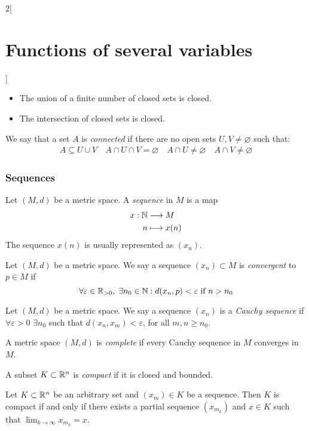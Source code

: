 \documentclass[../../../main.tex]{subfiles}
\begin{document}
\begin{multicols}{2}[\section{Functions of several variables}]
\begin{prop}
\begin{itemize}
            \item The union of a finite number of closed sets is closed.
            \item The intersection of closed sets is closed.
        \end{itemize}
    \end{prop}
    \begin{definition}
        We say that a set $A$ is \textit{connected} if there are no open sets $U,V\ne\varnothing$ such that:
        \begin{gather*}
            A\subseteq U\cup V\quad A\cap U\cap V=\varnothing\quad A\cap U\ne\varnothing\quad A\cap V\ne\varnothing
        \end{gather*}
    \end{definition}
    \subsubsection*{Sequences}
    \begin{definition}
        Let $(M,d)$ be a metric space. A \textit{sequence} in $M$ is a map
        \begin{align*}
            x:\mathbb{N} & \longrightarrow M \\
            n     & \longmapsto x(n)
        \end{align*}
        The sequence $x(n)$ is usually represented as $(x_n)$.
    \end{definition}
    \begin{definition}
        Let $(M,d)$ be a metric space. We say a sequence $(x_n)\subset M$ is \textit{convergent} to $p\in M$ if $$\forall\varepsilon\in\mathbb{R}_{>0},\;\exists n_0\in\mathbb{N} :d(x_n,p)<\varepsilon\text{ if }n>n_0$$
    \end{definition}
    \begin{definition}
        Let $(M,d)$ be a metric space. We say a sequence $(x_n)$ is a \textit{Cauchy sequence} if $\forall\varepsilon>0$ $\exists n_0$ such that $d(x_n,x_m)<\varepsilon$, for all $m,n\geq n_0$.
    \end{definition}
    \begin{definition}
        A metric space $(M,d)$ is \textit{complete} if every Cauchy sequence in $M$ converges in $M$.
        \label{FOSV_complete}
    \end{definition}
    \begin{definition}
        A subset $K\subset\mathbb{R}^n$ is \textit{compact} if it is closed and bounded.
    \end{definition}
    \begin{theorem}
        Let $K\subset\mathbb{R}^n$ be an arbitrary set and $(x_m)\in K$ be a sequence. Then $K$ is compact if and only if there exists a partial sequence $(x_{m_k})$ and $x\in K$ such that $\displaystyle\lim_{k\to\infty}x_{m_k}=x$.
    \end{theorem}

\end{multicols}
\end{document}
